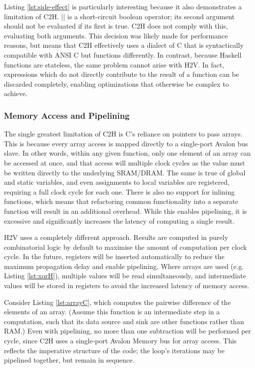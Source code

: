 \documentclass[english,onecolumn]{article}
\begin{document}
Listing \ref{lst:side-effect} is particularly interesting because it also demonstrates a limitation of C2H. || is a short-circuit boolean operator; its second argument should not be evaluated if its first is true.\cite[s 6.5.14]{c_std}
C2H does not comply with this, evaluating both arguments.\cite[128]{C2H_UG}
This decision was likely made for performance reasons, but means that C2H effectively uses a dialect of C that is syntactically compatible with ANSI C but functions differently.
In contrast, because Haskell functions are stateless, the same problem cannot arise with H2V. In fact, expressions which do not directly contribute to the result of a function can be discarded completely, enabling optimizations that otherwise be complex to achieve.

\subsubsection{Memory Access and Pipelining}
\label{s:pipeline}
The single greatest limitation of C2H is C's reliance on pointers to pass arrays. This is because every array access is mapped directly to a single-port Avalon bus slave.\cite[54]{C2H_UG} In other words, within any given function, only one element of an array can be accessed at once, and that access will multiple clock cycles as the value must be written directly to the underlying SRAM/DRAM.
The same is true of global and static variables,\cite[55]{C2H_UG} and even assignments to local variables are registered, requiring a full clock cycle for each one.\cite[53]{C2H_UG}
There is also no support for inlining functions, which means that refactoring common functionality into a separate function will result in an additional overhead.\cite[53]{C2H_UG}
While this enables pipelining, it is excessive and significantly increases the latency of computing a single result.

H2V uses a completely different approach. Results are computed in purely combinatorial logic by default to maximise the amount of computation per clock cycle. In the future, registers will be inserted automatically to reduce the maximum propagation delay and enable pipelining. Where arrays are used (e.g. Listing \ref{lst:xorH}), multiple values will be read simultaneously, and intermediate values will be stored in registers to avoid the increased latency of memory access.

Consider Listing \ref{lst:arrayC}, which computes the pairwise difference of the elements of an array.
(Assume this function is an intermediate step in a computation, such that its data source and sink are other functions rather than RAM.)
Even with pipelining, no more than one subtraction will be performed per cycle, since C2H uses a single-port Avalon Memory bus for array access. This reflects the imperative structure of the code; the loop's iterations may be pipelined together, but remain in sequence.
\end{document}
